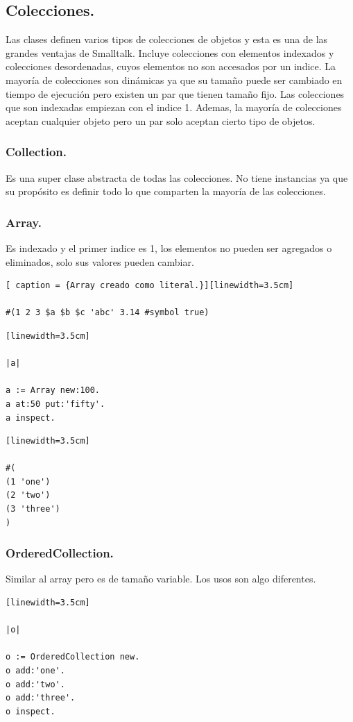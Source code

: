 \documentclass[10pt,journal,compsoc]{IEEEtran}
\begin{document}
\subsection{Colecciones.}
Las clases definen varios tipos de colecciones de objetos y esta es una de las grandes ventajas de Smalltalk. Incluye colecciones con elementos indexados y colecciones desordenadas, cuyos elementos no son accesados por un indice. La mayor\'ia de colecciones son din\'amicas ya que su tama\~no puede ser cambiado en tiempo de ejecuci\'on pero existen un par que tienen tama\~no fijo. Las colecciones que son indexadas empiezan con el indice 1. Ademas, la mayor\'ia de colecciones aceptan cualquier objeto pero un par solo aceptan cierto tipo de objetos.

\subsubsection{Collection.}
Es una super clase abstracta de todas las colecciones. No tiene instancias ya que su prop\'osito es definir todo lo que comparten la mayor\'ia de las colecciones.

\subsubsection{Array.}
Es indexado y el primer indice es 1, los elementos no pueden ser agregados o eliminados, solo sus valores pueden cambiar.
\begin{lstlisting}[ caption = {Array creado como literal.}][linewidth=3.5cm]

#(1 2 3 $a $b $c 'abc' 3.14 #symbol true)          

\end{lstlisting}
\begin{lstlisting}[language=Smalltalk, caption = {Array vacio con un tama\~no predefinido.}][linewidth=3.5cm]

|a|

a := Array new:100.
a at:50 put:'fifty'.
a inspect.         

\end{lstlisting}
\begin{lstlisting}[language=Smalltalk, caption = {Los elementos del array pueden ser arrays.}][linewidth=3.5cm]

#(
(1 'one')
(2 'two')
(3 'three')
)        

\end{lstlisting}
\subsubsection{OrderedCollection.}
Similar al array pero es de tama\~no variable. Los usos son algo diferentes.
\begin{lstlisting}[language=Smalltalk, caption = {Uso de OrderedCollection.}][linewidth=3.5cm]

|o|

o := OrderedCollection new.
o add:'one'.
o add:'two'.
o add:'three'.
o inspect.        

\end{lstlisting}
\end{document}
